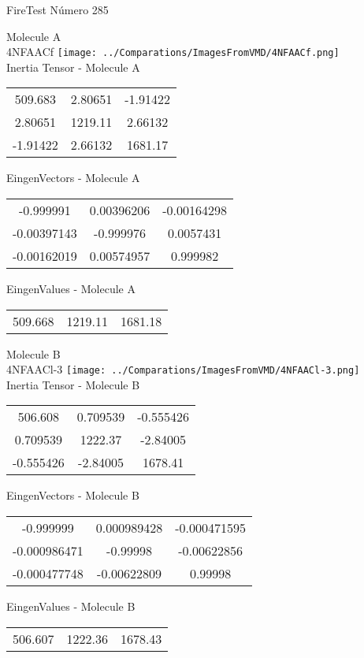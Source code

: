 \vtab[-2cm]
\begin{center}
{\large FireTest \tab Número 285}
\end{center}
\begin{multicols}{2}
\begin{center}

Molecule A \\ 
4NFAACf
\texttt{[image: ../Comparations/ImagesFromVMD/4NFAACf.png]}
\\
Inertia Tensor - Molecule A \\
\vtab

\begin{tabular}{|c c c|}
509.683	 & 	2.80651	 & 	-1.91422	 \\
2.80651	 & 	1219.11	 & 	2.66132	 \\
-1.91422	 & 	2.66132	 & 	1681.17
\end{tabular}

\vtab
 EingenVectors - Molecule A     \\
\vtab
\begin{tabular}{|c c c|}
-0.999991	 & 	0.00396206	 & 	-0.00164298	 \\
-0.00397143	 & 	-0.999976	 & 	0.0057431	 \\
-0.00162019	 & 	0.00574957	 & 	0.999982
\end{tabular}

\vtab
 EingenValues - Molecule A     \\
\vtab
\begin{tabular}{|c c c|}
509.668	 & 	1219.11	 & 	1681.18	 \\
\end{tabular}
\columnbreak

Molecule B \\ 
4NFAACl-3
\texttt{[image: ../Comparations/ImagesFromVMD/4NFAACl-3.png]}
\\
Inertia Tensor - Molecule B \\
\vtab

\begin{tabular}{|c c c|}
506.608	 & 	0.709539	 & 	-0.555426	 \\
0.709539	 & 	1222.37	 & 	-2.84005	 \\
-0.555426	 & 	-2.84005	 & 	1678.41
\end{tabular}

\vtab
 EingenVectors - Molecule B     \\
\vtab
\begin{tabular}{|c c c|}
-0.999999	 & 	0.000989428	 & 	-0.000471595	 \\
-0.000986471	 & 	-0.99998	 & 	-0.00622856	 \\
-0.000477748	 & 	-0.00622809	 & 	0.99998
\end{tabular}

\vtab
 EingenValues - Molecule B     \\
\vtab
\begin{tabular}{|c c c|}
506.607	 & 	1222.36	 & 	1678.43	 \\
\end{tabular}

\end{center}
\end{multicols}
